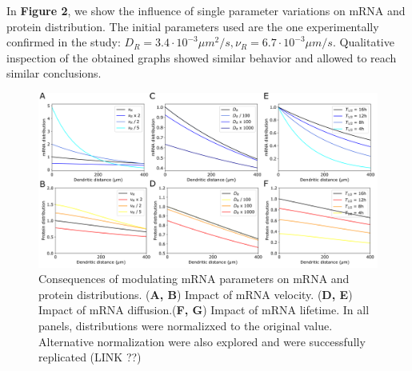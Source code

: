 In \textbf{Figure 2}, we show the influence of single parameter variations on mRNA and protein distribution. The initial parameters used are the one experimentally confirmed in the study: $D_{R}=3.4\cdot10^{-3} \mu m^{2}/s, \nu_{R}=6.7 \cdot 10^{-3} \mu m/s$. Qualitative inspection of the obtained graphs showed similar behavior and allowed to reach similar conclusions. 

\begin{figure}[H]
  \includegraphics[width=\textwidth]{Figure2.png}
  \caption{Consequences of modulating mRNA parameters on mRNA and protein distributions. (\textbf{A, B}) Impact of mRNA velocity. (\textbf{D, E}) Impact of mRNA diffusion.(\textbf{F, G}) Impact of mRNA lifetime. In all panels, distributions were normalizxed to the original value. Alternative normalization were also explored and were successfully replicated (LINK ??)}
\end{figure}





